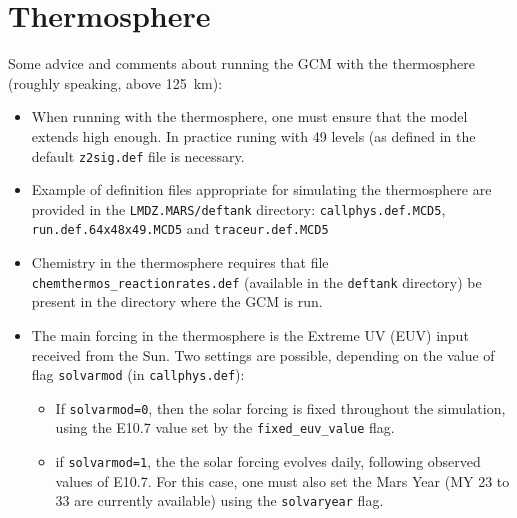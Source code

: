 \chapter{Thermosphere}

\label{sc:thermosphere}

Some advice and comments about running the GCM with the thermosphere (roughly speaking, above 125~km):
\begin{itemize}
\item When running with the thermosphere, one must ensure that the model extends high enough. In practice runing with 49 levels (as defined in the default {\tt z2sig.def} file is necessary.
\item Example of definition files appropriate for simulating the thermosphere are provided in the
{\tt LMDZ.MARS/deftank} directory: {\tt callphys.def.MCD5}, {\tt run.def.64x48x49.MCD5} and {\tt traceur.def.MCD5} 
\item Chemistry in the thermosphere requires that file {\tt chemthermos\_reactionrates.def} (available in the
{\tt deftank} directory) be present in the directory where the GCM is run.
\item The main forcing in the thermosphere is the Extreme UV (EUV) input received from the Sun. Two settings are possible, depending on the value of flag {\tt solvarmod} (in {\tt callphys.def}):
 \begin{itemize}
 \item If {\tt solvarmod=0}, then the solar forcing is fixed throughout the simulation, using the E10.7 value set by the {\tt fixed\_euv\_value} flag.
 \item if {\tt solvarmod=1}, the the solar forcing evolves daily, following observed values of E10.7. For this case, one must also set the Mars Year (MY 23 to 33 are currently available) using the {\tt solvaryear} flag.
\end{itemize}
\end{itemize} 
